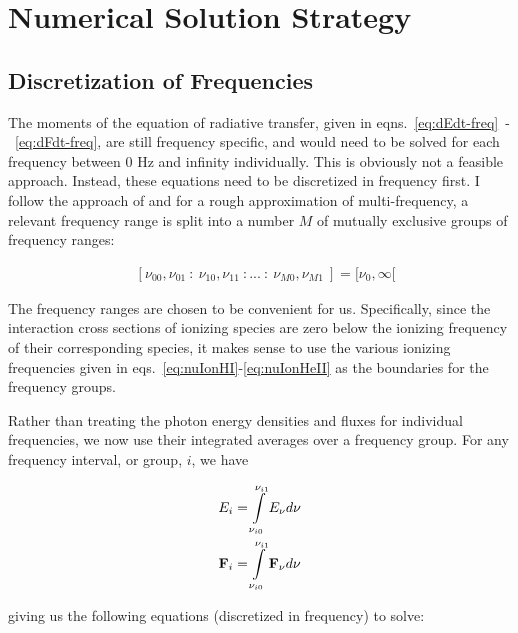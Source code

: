 \section{Numerical Solution Strategy}\label{chap:rt-numerical-strategy}


\subsection{Discretization of Frequencies}


The moments of the equation of radiative transfer, given in
eqns.~\ref{eq:dEdt-freq}~-~\ref{eq:dFdt-freq}, are still frequency specific, and would need to be
solved for each frequency between 0 Hz and infinity individually. This is obviously not a feasible
approach. Instead, these equations need to be discretized in frequency first. I follow the approach
of \cite{ramses-rt13} and for a rough approximation of multi-frequency, a relevant frequency range
is split into a number $M$ of mutually exclusive groups of frequency ranges:

\begin{align*}
	& [\nu_{00}, \nu_{01}\ : \ \nu_{10}, \nu_{11}\ : ... \ : \ \nu_{M0}, \nu_{M1}\ ] =
        [\nu_{0}, \infty [
\end{align*}

The frequency ranges are chosen to be convenient for us. Specifically, since the interaction cross
sections of ionizing species are zero below the ionizing frequency of their corresponding species,
it makes sense to use the various ionizing frequencies given in
eqs.~\ref{eq:nuIonHI}-\ref{eq:nuIonHeII} as the boundaries for the frequency groups.




Rather than treating the photon energy densities and fluxes for individual frequencies, we now use
their integrated averages over a frequency group. For any frequency interval, or group, $i$, we have

\begin{align}
	E_i &=
        \int\limits_{\nu_{i0}}^{\nu_{i1}} E_\nu d\nu \\
	\mathbf{F}_i &=
       \int\limits_{\nu_{i0}}^{\nu_{i1}} \mathbf{F}_\nu d\nu
\end{align}


giving us the following equations (discretized in frequency) to solve:


